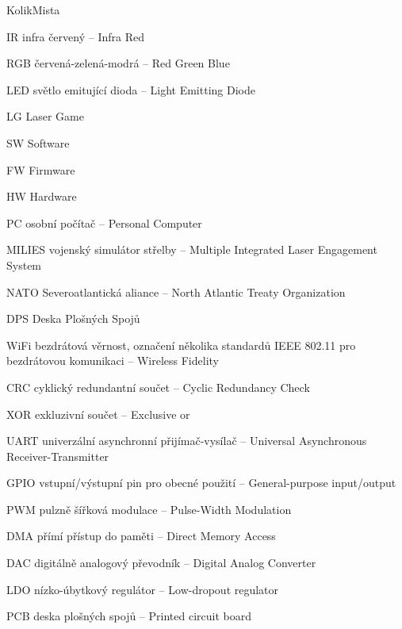 \begin{seznamzkratek}{KolikMista}

        {IR}
        {infra červený -- Infra Red}

        {RGB}
        {červená-zelená-modrá -- Red Green Blue}

        {LED}
        {světlo emitující dioda -- Light Emitting Diode}

        {LG}
        {Laser Game}

        {SW}
        {Software}

        {FW}
        {Firmware}

        {HW}
        {Hardware}

        {PC}
        {osobní počítač -- Personal Computer}

        {MILIES}
        {vojenský simulátor střelby -- Multiple Integrated Laser Engagement System}

        {NATO}
        {Severoatlantická aliance -- North Atlantic Treaty Organization}

        {DPS}
        {Deska Plošných Spojů}

        {WiFi}
        {bezdrátová věrnost, označení několika standardů IEEE 802.11 pro bezdrátovou komunikaci -- Wireless Fidelity}

        {CRC}
        {cyklický redundantní součet --  Cyclic Redundancy Check}

        {XOR}
        {exkluzivní součet --  Exclusive or}

        {UART}
        {univerzální asynchronní přijímač-vysílač --  Universal Asynchronous Receiver-Transmitter}

        {GPIO}
        {vstupní/výstupní pin pro obecné použití --  General-purpose input/output}

        {PWM}
        {pulzně šířková modulace --  Pulse-Width Modulation}

        {DMA}
        {přímí přístup do paměti --  Direct Memory Access}

        {DAC}
        {digitálně analogový převodník --  Digital Analog Converter}

        {LDO}
        {nízko-úbytkový regulátor --  Low-dropout regulator}

        {PCB}
        {deska plošných spojů --  Printed circuit board}

\end{seznamzkratek}
